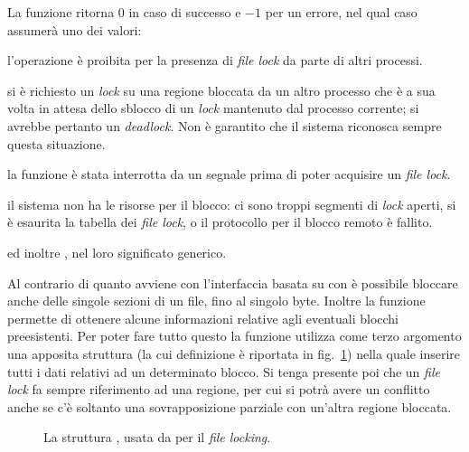 \begin{funcproto}{
}

{La funzione ritorna $0$ in caso di successo e $-1$ per un errore, nel qual
  caso  assumerà uno dei valori: 
  \begin{errlist}
    \item[\errcode{EACCES}] l'operazione è proibita per la presenza di
      \textit{file lock} da parte di altri processi.
    \item[\errcode{EDEADLK}] si è richiesto un \textit{lock} su una regione
      bloccata da un altro processo che è a sua volta in attesa dello sblocco
      di un \textit{lock} mantenuto dal processo corrente; si avrebbe pertanto
      un \textit{deadlock}. Non è garantito che il sistema riconosca sempre
      questa situazione.
    \item[\errcode{EINTR}] la funzione è stata interrotta da un segnale prima
      di poter acquisire un \textit{file lock}.
    \item[\errcode{ENOLCK}] il sistema non ha le risorse per il blocco: ci
      sono troppi segmenti di \textit{lock} aperti, si è esaurita la tabella
      dei \textit{file lock}, o il protocollo per il blocco remoto è fallito.
  \end{errlist}
  ed inoltre ,  nel loro significato generico.}
\end{funcproto}

Al contrario di quanto avviene con l'interfaccia basata su  con
 è possibile bloccare anche delle singole sezioni di un file, fino
al singolo byte. Inoltre la funzione permette di ottenere alcune informazioni
relative agli eventuali blocchi preesistenti.  Per poter fare tutto questo la
funzione utilizza come terzo argomento una apposita struttura 
(la cui definizione è riportata in fig.~\ref{fig:struct_flock}) nella quale
inserire tutti i dati relativi ad un determinato blocco. Si tenga presente poi
che un \textit{file lock} fa sempre riferimento ad una regione, per cui si
potrà avere un conflitto anche se c'è soltanto una sovrapposizione parziale
con un'altra regione bloccata.

\begin{figure}[!htb]
  \footnotesize \centering
  \begin{minipage}[c]{0.90\textwidth}
  \end{minipage} 
  \normalsize 
  \caption{La struttura , usata da  per il
    \textit{file locking}.}
  \label{fig:struct_flock}
\end{figure}

